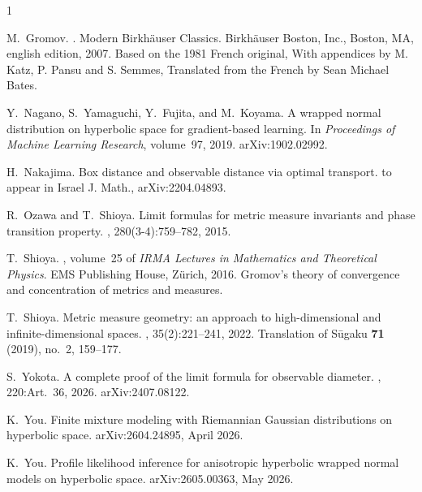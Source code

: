 \documentclass{amsart}
\numberwithin{equation}{section}
\theoremstyle{plain}
\theoremstyle{definition}
\theoremstyle{remark}
\begin{document}
\begin{thebibliography}{1}

M.~Gromov.
.
\newblock Modern Birkh\"auser Classics. Birkh\"auser Boston, Inc., Boston, MA,
  english edition, 2007.
\newblock Based on the 1981 French original, With appendices by M. Katz, P.
  Pansu and S. Semmes, Translated from the French by Sean Michael Bates.

Y.~Nagano, S.~Yamaguchi, Y.~Fujita, and M.~Koyama.
\newblock A wrapped normal distribution on hyperbolic space for gradient-based
  learning.
\newblock In {\em Proceedings of Machine Learning Research}, volume~97, 2019.
\newblock arXiv:1902.02992.

H.~Nakajima.
\newblock Box distance and observable distance via optimal transport.
\newblock to appear in Israel J. Math., arXiv:2204.04893.

R.~Ozawa and T.~Shioya.
\newblock Limit formulas for metric measure invariants and phase transition
  property.
, 280(3-4):759--782, 2015.

T.~Shioya.
, volume~25 of {\em IRMA Lectures in
  Mathematics and Theoretical Physics}.
\newblock EMS Publishing House, Z\"urich, 2016.
\newblock Gromov's theory of convergence and concentration of metrics and
  measures.

T.~Shioya.
\newblock Metric measure geometry: an approach to high-dimensional and
  infinite-dimensional spaces.
, 35(2):221--241, 2022.
\newblock Translation of S\={u}gaku \textbf{71} (2019), no.~2, 159--177.

S.~Yokota.
\newblock A complete proof of the limit formula for observable diameter.
, 220:Art.~36, 2026.
\newblock arXiv:2407.08122.

K.~You.
\newblock Finite mixture modeling with Riemannian Gaussian distributions on
  hyperbolic space.
\newblock arXiv:2604.24895, April 2026.

K.~You.
\newblock Profile likelihood inference for anisotropic hyperbolic wrapped
  normal models on hyperbolic space.
\newblock arXiv:2605.00363, May 2026.

\end{thebibliography}
\end{document}
